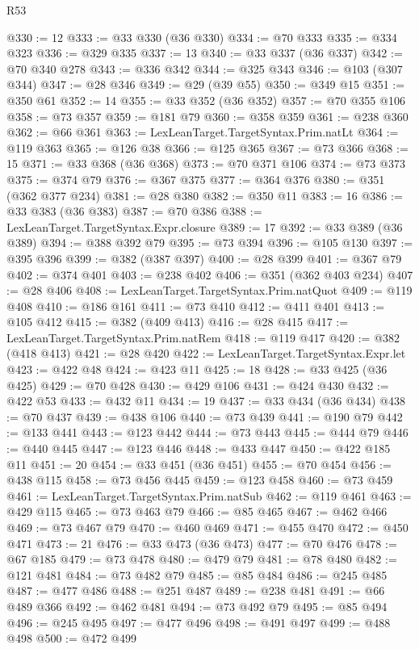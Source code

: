 \begin{lexlean}{R53}
\begin{coremodule}
@330 := 12
@333 := @33 @330 (@36 @330)
@334 := @70 @333
@335 := @334 @323
@336 := @329 @335
@337 := 13
@340 := @33 @337 (@36 @337)
@342 := @70 @340 @278
@343 := @336 @342
@344 := @325 @343
@346 := @103 (@307 @344)
@347 := @28 @346
@349 := @29 (@39 @55)
@350 := @349 @15
@351 := @350 @61
@352 := 14
@355 := @33 @352 (@36 @352)
@357 := @70 @355 @106
@358 := @73 @357
@359 := @181 @79
@360 := @358 @359
@361 := @238 @360
@362 := @66 @361
@363 := LexLeanTarget.TargetSyntax.Prim.natLt
@364 := @119 @363
@365 := @126 @38
@366 := @125 @365
@367 := @73 @366
@368 := 15
@371 := @33 @368 (@36 @368)
@373 := @70 @371 @106
@374 := @73 @373
@375 := @374 @79
@376 := @367 @375
@377 := @364 @376
@380 := @351 (@362 @377 @234)
@381 := @28 @380
@382 := @350 @11
@383 := 16
@386 := @33 @383 (@36 @383)
@387 := @70 @386
@388 := LexLeanTarget.TargetSyntax.Expr.closure
@389 := 17
@392 := @33 @389 (@36 @389)
@394 := @388 @392 @79
@395 := @73 @394
@396 := @105 @130
@397 := @395 @396
@399 := @382 (@387 @397)
@400 := @28 @399
@401 := @367 @79
@402 := @374 @401
@403 := @238 @402
@406 := @351 (@362 @403 @234)
@407 := @28 @406
@408 := LexLeanTarget.TargetSyntax.Prim.natQuot
@409 := @119 @408
@410 := @186 @161
@411 := @73 @410
@412 := @411 @401
@413 := @105 @412
@415 := @382 (@409 @413)
@416 := @28 @415
@417 := LexLeanTarget.TargetSyntax.Prim.natRem
@418 := @119 @417
@420 := @382 (@418 @413)
@421 := @28 @420
@422 := LexLeanTarget.TargetSyntax.Expr.let
@423 := @422 @48
@424 := @423 @11
@425 := 18
@428 := @33 @425 (@36 @425)
@429 := @70 @428
@430 := @429 @106
@431 := @424 @430
@432 := @422 @53
@433 := @432 @11
@434 := 19
@437 := @33 @434 (@36 @434)
@438 := @70 @437
@439 := @438 @106
@440 := @73 @439
@441 := @190 @79
@442 := @133 @441
@443 := @123 @442
@444 := @73 @443
@445 := @444 @79
@446 := @440 @445
@447 := @123 @446
@448 := @433 @447
@450 := @422 @185 @11
@451 := 20
@454 := @33 @451 (@36 @451)
@455 := @70 @454
@456 := @438 @115
@458 := @73 @456 @445
@459 := @123 @458
@460 := @73 @459
@461 := LexLeanTarget.TargetSyntax.Prim.natSub
@462 := @119 @461
@463 := @429 @115
@465 := @73 @463 @79
@466 := @85 @465
@467 := @462 @466
@469 := @73 @467 @79
@470 := @460 @469
@471 := @455 @470
@472 := @450 @471
@473 := 21
@476 := @33 @473 (@36 @473)
@477 := @70 @476
@478 := @67 @185
@479 := @73 @478
@480 := @479 @79
@481 := @78 @480
@482 := @121 @481
@484 := @73 @482 @79
@485 := @85 @484
@486 := @245 @485
@487 := @477 @486
@488 := @251 @487
@489 := @238 @481
@491 := @66 @489 @366
@492 := @462 @481
@494 := @73 @492 @79
@495 := @85 @494
@496 := @245 @495
@497 := @477 @496
@498 := @491 @497
@499 := @488 @498
@500 := @472 @499

\end{coremodule}
\end{lexlean}
